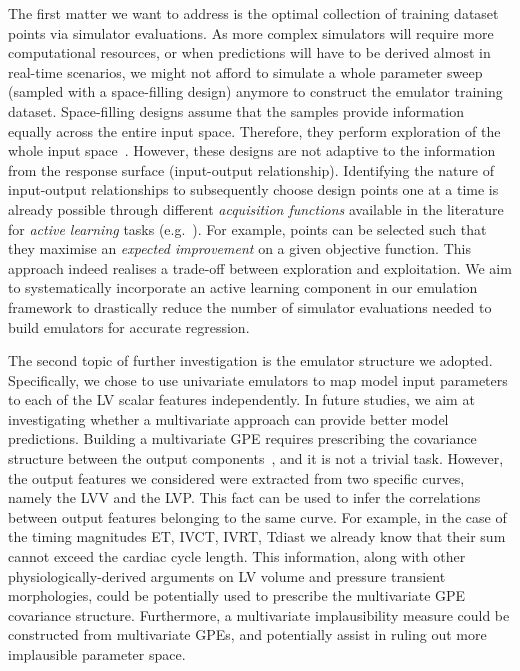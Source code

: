 \vspace{0.2cm}
The first matter we want to address is the optimal collection of training dataset points via simulator evaluations. As more complex simulators will require more computational resources, or when predictions will have to be derived almost in real-time scenarios, we might not afford to simulate a whole parameter sweep (sampled with a space-filling design) anymore to construct the emulator training dataset. Space-filling designs assume that the samples provide information equally across the entire input space. Therefore, they perform exploration of the whole input space~\cite{Yue:2021}. However, these designs are not adaptive to the information from the response surface (input-output relationship). Identifying the nature of input-output relationships to subsequently choose design points one at a time is already possible through different \textit{acquisition functions} available in the literature for \textit{active learning} tasks (e.g.~\cite{Jones:1998,Pasolli:2011,Schreiter:2015}). For example, points can be selected such that they maximise an \textit{expected improvement} on a given objective function. This approach indeed realises a trade-off between exploration and exploitation. We aim to systematically incorporate an active learning component in our emulation framework to drastically reduce the number of simulator evaluations needed to build emulators for accurate regression.

\vspace{0.2cm}
The second topic of further investigation is the emulator structure we adopted. Specifically, we chose to use univariate emulators to map model input parameters to each of the LV scalar features independently. In future studies, we aim at investigating whether a multivariate approach can provide better model predictions. Building a multivariate GPE requires prescribing the covariance structure between the output components~\cite{Bonilla:2008,Rougier:2008,Conti:2010}, and it is not a trivial task. However, the output features we considered were extracted from two specific curves, namely the LVV and the LVP. This fact can be used to infer the correlations between output features belonging to the same curve. For example, in the case of the timing magnitudes ET, IVCT, IVRT, Tdiast we already know that their sum cannot exceed the cardiac cycle length. This information, along with other physiologically-derived arguments on LV volume and pressure transient morphologies, could be potentially used to prescribe the multivariate GPE covariance structure. Furthermore, a multivariate implausibility measure could be constructed from multivariate GPEs, and potentially assist in ruling out more implausible parameter space.

